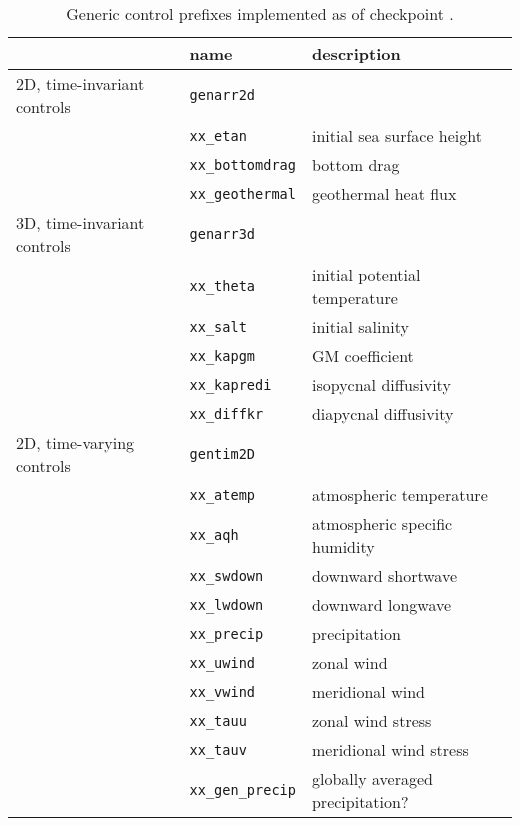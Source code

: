 \begin{table}[!ht]
\centering
\begin{tabular}{lll}
					&	name							&	description	\\ \hline \hline
2D, time-invariant controls & \texttt{genarr2d} \\
					&	\texttt{xx\_etan} 				&	initial sea surface height	\\
					&	\texttt{xx\_bottomdrag} 		&	bottom drag \\
					&	\texttt{xx\_geothermal} 		&	geothermal heat flux \\ \hline
3D, time-invariant controls & \texttt{genarr3d} \\
					&	\texttt{xx\_theta} 				&	initial potential temperature	\\
					&	\texttt{xx\_salt} 				&	initial salinity \\
					&	\texttt{xx\_kapgm}		 		&	GM coefficient \\ 
					&	\texttt{xx\_kapredi}	 		&	isopycnal diffusivity \\ 
					&	\texttt{xx\_diffkr}	 			&	diapycnal diffusivity \\ \hline
2D, time-varying controls 	&	\texttt{gentim2D}	\\ 
					&	\texttt{xx\_atemp}				&	atmospheric temperature \\
					&	\texttt{xx\_aqh}				&	atmospheric specific humidity \\
					&	\texttt{xx\_swdown}				&	downward shortwave \\
					&	\texttt{xx\_lwdown}				&	downward longwave \\
					&	\texttt{xx\_precip}				&	precipitation \\
					&	\texttt{xx\_uwind}				&	zonal wind \\
					&	\texttt{xx\_vwind}				&	meridional wind \\
					&	\texttt{xx\_tauu}				&	zonal wind stress \\					
					&	\texttt{xx\_tauv}				&	meridional wind stress \\					
					&	\texttt{xx\_gen\_precip}		&	globally averaged precipitation? \\					
\end{tabular}
\caption{Generic control prefixes implemented as of checkpoint \mitgcmCheckpointVersion.}
\label{tbl:gencost_ctrl_files}
\end{table}

